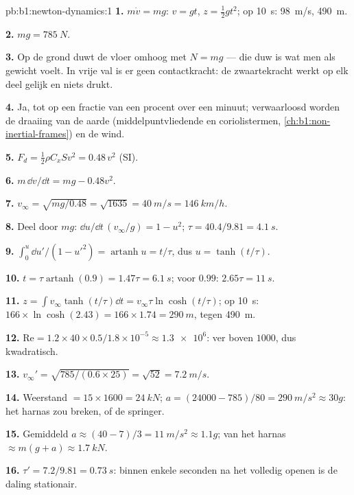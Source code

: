 \begin{solution}{pb:b1:newton-dynamics:1}
\textbf{1.} $m\dot v = mg$: $v = gt$, $z = \tfrac12 gt^2$; op \qty{10}{s}:
\qty{98}{m/s}, \qty{490}{m}.

\textbf{2.} $mg = \qty{785}{N}$.

\textbf{3.} Op de grond duwt de vloer omhoog met $N = mg$ --- die duw
is wat men als gewicht voelt. In vrije val is er geen contactkracht: de
zwaartekracht werkt op elk deel gelijk en niets drukt.

\textbf{4.} Ja, tot op een fractie van een procent over een minuut; verwaarloosd worden
de draaiing van de aarde (middelpuntvliedende en coriolistermen,
\cref{ch:b1:non-inertial-frames}) en de wind.

\textbf{5.} $F_d = \tfrac12\rho C_xSv^2 = 0.48\,v^2$ (SI).

\textbf{6.} $m\,\dd v/\dd t = mg - 0.48v^2$.

\textbf{7.} $v_\infty = \sqrt{mg/0.48} = \sqrt{1635} = \qty{40}{m/s} =
\qty{146}{km/h}$.

\textbf{8.} Deel door $mg$: $\dd u/\dd t\,(v_\infty/g) = 1 - u^2$;
$\tau = 40.4/9.81 = \qty{4.1}{s}$.

\textbf{9.} $\int_0^u\dd u'/(1 - u'^2) = \operatorname{artanh}u = t/\tau$,
dus $u = \tanh(t/\tau)$.

\textbf{10.} $t = \tau\operatorname{artanh}(0.9) = 1.47\tau = \qty{6.1}{s}$;
voor $0.99$: $2.65\tau = \qty{11}{s}$.

\textbf{11.} $z = \int v_\infty\tanh(t/\tau)\dd t = v_\infty\tau\ln\cosh(t/\tau)$;
op \qty{10}{s}: $166 \times \ln\cosh(2.43) = 166 \times 1.74 = \qty{290}{m}$,
tegen \qty{490}{m}.

\textbf{12.} $\mathrm{Re} = 1.2 \times 40 \times 0.5/1.8\times10^{-5} \approx
\num{1.3e6}$: ver boven $1000$, dus kwadratisch.

\textbf{13.} $v_\infty' = \sqrt{785/(0.6 \times 25)} = \sqrt{52} = \qty{7.2}{m/s}$.

\textbf{14.} Weerstand $= 15 \times 1600 = \qty{24}{kN}$; $a = (24000 - 785)/80
= \qty{290}{m/s^2} \approx 30g$: het harnas zou breken, of de springer.

\textbf{15.} Gemiddeld $a \approx (40 - 7)/3 = \qty{11}{m/s^2} \approx 1.1g$;
 van het harnas $\approx m(g + a) \approx \qty{1.7}{kN}$.

\textbf{16.} $\tau' = 7.2/9.81 = \qty{0.73}{s}$: binnen enkele seconden na het
volledig openen is de daling stationair.


\end{solution}
